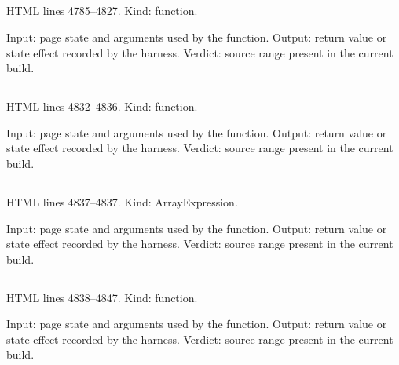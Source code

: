 \subsection*{\texttt{}}
\label{vf_203_extraForensicEventsUncached}
HTML lines 4785--4827. Kind: function.

Input: page state and arguments used by the function.
Output: return value or state effect recorded by the harness.
Verdict: source range present in the current build.

\subsection*{\texttt{}}
\label{vf_204_sopOutcomeFor}
HTML lines 4832--4836. Kind: function.

Input: page state and arguments used by the function.
Output: return value or state effect recorded by the harness.
Verdict: source range present in the current build.

\subsection*{\texttt{}}
\label{vf_205_SOP_OUTCOME_OPTIONS}
HTML lines 4837--4837. Kind: ArrayExpression.

Input: page state and arguments used by the function.
Output: return value or state effect recorded by the harness.
Verdict: source range present in the current build.

\subsection*{\texttt{}}
\label{vf_206_sopField}
HTML lines 4838--4847. Kind: function.

Input: page state and arguments used by the function.
Output: return value or state effect recorded by the harness.
Verdict: source range present in the current build.


